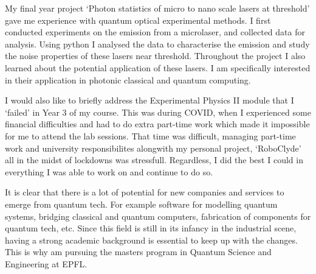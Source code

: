 \documentclass[10pt]{article}
\begin{document}
\vspace{5mm}

My final year project \enquote*{Photon statistics of micro to nano scale lasers at threshold} gave me 
experience with quantum optical experimental methods. I first conducted  experiments on the emission 
from a microlaser, and collected data for analysis. Using python I analysed the data to characterise
the emission and study the noise properties of these lasers near threshold. Throughout the project I 
also learned about the potential application of these lasers. I am specifically interested in their 
application in photonic 
classical and quantum computing.

\vspace{5mm}

I would also like to briefly address the Experimental Physics II module that I \enquote*{failed}
in Year 3 of my course. This was during COVID, when I experienced some financial difficulties 
and had to do extra part-time work which made it impossible for me to attend the lab sessions. 
That time was difficult, managing part-time work and university responsibilites alongwith my 
personal project, \enquote*{RoboClyde} all in the midst of lockdowns was stressfull. Regardless, I 
did the best I could in everything I was able to work on and continue to do so.

\vspace{5mm}

It is clear that there is a lot of potential for new companies and services to emerge from quantum
tech. For example software for modelling quantum systems, bridging classical and quantum computers,
fabrication of components for quantum tech, etc. Since this field is still in its infancy in the 
industrial scene, having a strong academic background is essential to keep up with the changes. This 
is why am pursuing the masters program in Quantum Science and Engineering at EPFL.
\end{document}

